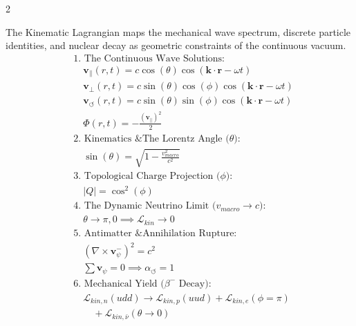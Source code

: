 \documentclass[11pt, a4paper]{article}
\newcounter{cheatnum}
\begin{document}
\begin{multicols}{2}
\begin{tcolorbox}[cheatbox, title={\refstepcounter{cheatnum}\label{box:wave_mechanics}\thecheatnum. Continuous Wave Mechanics \& Topological Phase States \scriptsize\hfill\hyperref[sec:deriv_wave_mechanics]{[Proof $\downarrow$]}}]
The Kinematic Lagrangian maps the mechanical wave spectrum, discrete particle identities, and nuclear decay as geometric constraints of the continuous vacuum.
\begin{align}
    &\text{1. The Continuous Wave Solutions:} \nonumber \\
    &\quad \mathbf{v}_{\parallel}(r,t) = c \cos(\theta) \cos(\mathbf{k} \cdot \mathbf{r} - \omega t) \label{eq:wave_p} \\
    &\quad \mathbf{v}_{\perp}(r,t) = c \sin(\theta)\cos(\phi) \cos(\mathbf{k} \cdot \mathbf{r} - \omega t) \label{eq:wave_s} \\
    &\quad \mathbf{v}_{\circlearrowleft}(r,t) = c \sin(\theta)\sin(\phi) \cos(\mathbf{k} \cdot \mathbf{r} - \omega t) \label{eq:wave_rot} \\
    &\quad \Phi(r,t) = - \frac{(\mathbf{v}_{\parallel})^2}{2} \label{eq:p_wave_potential} \\
    &\text{2. Kinematics \& The Lorentz Angle ($\theta$):} \nonumber \\
    &\quad \sin(\theta) = \sqrt{1 - \frac{v_{macro}^2}{c^2}} \label{eq:lorentz_angle} \\
    &\text{3. Topological Charge Projection ($\phi$):} \nonumber \\
    &\quad |Q| = \cos^2(\phi) \label{eq:charge_projection} \\
    &\text{4. The Dynamic Neutrino Limit ($v_{macro} \to c$):} \nonumber \\
    &\quad \theta \to \pi, 0 \implies \mathcal{L}_{kin} \to 0 \label{eq:phase_neutrino} \\
    &\text{5. Antimatter \& Annihilation Rupture:} \nonumber \\
    &\quad (\nabla \times \mathbf{v}_{\psi}^-)^2 = c^2 \label{eq:antimatter_state} \\
    &\quad \sum \mathbf{v}_{\psi} = 0 \implies \alpha_{\circlearrowleft} = 1 \label{eq:annihilation_limit} \\
    &\text{6. Mechanical Yield ($\beta^-$ Decay):} \nonumber \\
    &\quad \mathcal{L}_{kin, n}(udd) \to \mathcal{L}_{kin, p}(uud) + \mathcal{L}_{kin, e}(\phi=\pi) \nonumber \\
    &\quad \quad + \mathcal{L}_{kin, \bar{\nu}}(\theta \to 0) \label{eq:neutron_rupture}
\end{align}
\end{tcolorbox}






\end{multicols}
\end{document}
